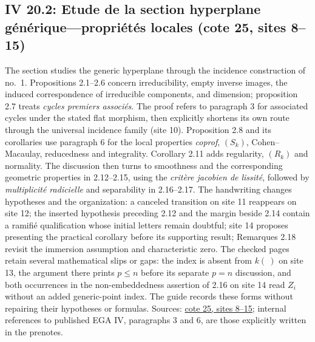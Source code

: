 \subsection*{IV 20.2: Etude de la section hyperplane générique---propriétés locales (cote 25, sites 8--15)}
The section studies the generic hyperplane through the incidence construction of no.\ 1. Propositions 2.1--2.6 concern irreducibility, empty inverse images, the induced correspondence of irreducible components, and dimension; proposition 2.7 treats \emph{cycles premiers associés}. The proof refers to paragraph 3 for associated cycles under the stated flat morphism, then explicitly shortens its own route through the universal incidence family (site 10). Proposition 2.8 and its corollaries use paragraph 6 for the local properties \emph{coprof}, $(S_k)$, Cohen--Macaulay, reducedness and integrality. Corollary 2.11 adds regularity, $(R_k)$ and normality. The discussion then turns to smoothness and the corresponding geometric properties in 2.12--2.15, using the \emph{critère jacobien de lissité}, followed by \emph{multiplicité radicielle} and separability in 2.16--2.17. The handwriting changes hypotheses and the organization: a canceled transition on site 11 reappears on site 12; the inserted hypothesis preceding 2.12 and the margin beside 2.14 contain a ramifié qualification whose initial letters remain doubtful; site 14 proposes presenting the practical corollary before its supporting result; Remarques 2.18 revisit the immersion assumption and characteristic zero. The checked pages retain several mathematical slips or gaps: the index is absent from $k(\ )$ on site 13, the argument there prints $p\leq n$ before its separate $p=n$ discussion, and both occurrences in the non-embeddedness assertion of 2.16 on site 14 read $Z_i$ without an added generic-point index. The guide records these forms without repairing their hypotheses or formulas. Sources: \href{https://grothendieck.umontpellier.fr/web/viewer.html?file=../25.pdf\#page=9}{cote 25, sites 8--15}; internal references to published EGA IV, paragraphs 3 and 6, are those explicitly written in the prenotes.
